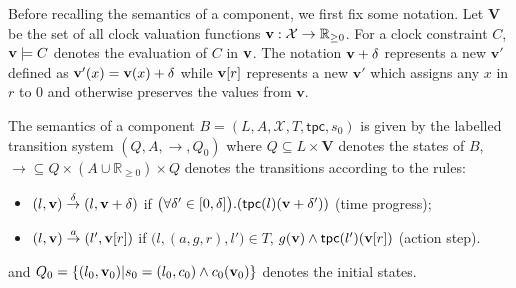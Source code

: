 \documentclass{LMCS}
\newcommand{\X}{\mathcal{X}}
\newcommand{\inv}{\mathsf{tpc}}
\newcommand{\bv}{\bold{v}}
\newcommand{\transit}[1]{\stackrel{#1}{\rightarrow}}
\theoremstyle{plain}\newtheorem{remark}[thm]{Remark}
\theoremstyle{plain}\newtheorem{example}[thm]{Example}
\begin{document}
Before recalling the semantics of a component, we first fix some notation.
Let $\mathbf{V}$ be the set of all clock valuation functions $\bv:
\X\rightarrow \mathbb{R}_{\ge 0}$.  For a clock constraint $C$, $\bv \models C$
denotes the evaluation of $C$ in $\bv$. The notation $\bv + \delta$
represents a new $\mathbf{v'}$ defined as $\mathbf{v'}(x) = \bv(x) +
\delta$ while $\bv[r]$ represents a new $\mathbf{v'}$ which assigns any $x$
in $r$ to 0 and otherwise preserves the values from $\mathbf{v}$.

\begin{defi}[Semantics]The semantics of a component $B = (L, A, \X, T, \inv, s_0)$ is given by
  the labelled transition system $(Q, A, \rightarrow, Q_0)$ where $Q
  \subseteq L\times \mathbf{V}$ denotes the states of $B$,
  ${\rightarrow} \subseteq Q\times (A\cup \mathbb{R}_{\ge 0}) \times
  Q$ denotes the transitions according to the rules:
    \begin{itemize}
    \item $(l,\bv) \transit{\delta} (l,\bv+\delta)$ if $ \big(\forall \delta'\in[0,\delta]\big).(\inv(l)(\bv+\delta'))$ (time progress);
    \item $(l,\bv) \transit{a} (l',\bv[r])$ if $\big(l,(a,g,r),l'\big)\in T$, $g(\bv)\wedge \inv(l')(\bv[r])$ (action step).
    \end{itemize}
    and $Q_0 = \{ (l_0, \bv_0) | s_0 = (l_0, c_0) \wedge c_0(\bv_0) \}$ denotes the initial states. 
\end{defi}
\end{document}
